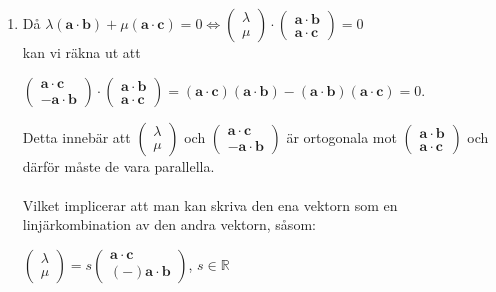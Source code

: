 \documentclass[a4paper]{report}
\begin{document}
\begin{enumerate}
\begin{enumerate}
            \item
                Då $\lambda (\bm{a}\cdot \bm{b})+\mu (\bm{a}\cdot \bm{c})=0 \Leftrightarrow \begin{pmatrix}\lambda\\\mu\end{pmatrix} \cdot \begin{pmatrix}\bm{a}\cdot \bm{b}\\ \bm{a} \cdot \bm{c} \end{pmatrix} = 0$\\
                kan vi räkna ut att 
                \begin{center}
                    $\begin{pmatrix}\bm{a}\cdot \bm{c}\\ \bm{-a} \cdot \bm{b} \end{pmatrix}\cdot\begin{pmatrix}\bm{a}\cdot \bm{b}\\ \bm{a} \cdot \bm{c} \end{pmatrix} = (\bm{a}\cdot\bm{c})(\bm{a}\cdot\bm{b})-(\bm{a}\cdot\bm{b})(\bm{a}\cdot\bm{c})=0$.
                \end{center}
                Detta innebär att $\begin{pmatrix}\lambda\\\mu\end{pmatrix}$ och $\begin{pmatrix}\bm{a}\cdot \bm{c}\\ \bm{-a} \cdot \bm{b} \end{pmatrix}$ är ortogonala mot $\begin{pmatrix}\bm{a}\cdot \bm{b}\\ \bm{a} \cdot \bm{c} \end{pmatrix}$ och
                därför måste de vara parallella.\\\\
                Vilket implicerar att man kan skriva den ena vektorn som en linjärkombination av den andra vektorn, såsom:
                \begin{center}
                    $\begin{pmatrix}\lambda\\\mu\end{pmatrix}=s\begin{pmatrix}\bm{a}\cdot\bm{c}\\ (-)\bm{a}\cdot\bm{b}\end{pmatrix}$, $s \in \mathbb{R}$
                \end{center}

\end{enumerate}
\end{enumerate}
\end{document}

